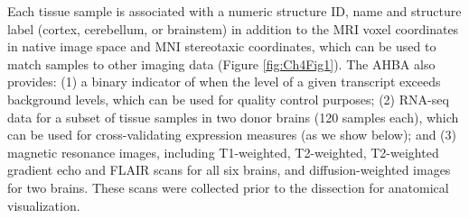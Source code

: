 Each tissue sample is associated with a numeric structure ID, name and structure label (cortex, cerebellum, or brainstem) in addition to the MRI voxel coordinates in native image space and MNI stereotaxic coordinates, which can be used to match samples to other imaging data (Figure \ref{fig:Ch4Fig1}). The AHBA also provides: (1) a binary indicator of when the level of a given transcript exceeds background levels, which can be used for quality control purposes; (2) RNA-seq data for a subset of tissue samples in two donor brains (120 samples each), which can be used for cross-validating expression measures (as we show below); and (3) magnetic resonance images, including T1-weighted, T2-weighted, T2-weighted gradient echo and FLAIR scans for all six brains, and diffusion-weighted images for two brains. These scans were collected prior to the dissection for anatomical visualization.

